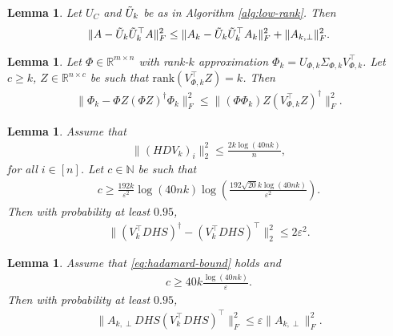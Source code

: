 \documentclass[13pt]{article}
\newtheorem{lem}[thm]{Lemma}
\theoremstyle{plain}
\newcommand{\R}{\mathbb{R}}
\newcommand{\N}{\mathbb{N}}
\newcommand{\rank}{\mathrm{rank}}
\newcommand{\til}{\ensuremath{\tilde}}
\begin{document}
\begin{lem}
    Let $U_C$ and $\til{U}_k$ be as in Algorithm \ref{alg:low-rank}.
    Then
    \[
        \begin{aligned}
            \|A - \til{U}_k\til{U}_k^\top A\|_F^2 \le \|A_k - \til{U}_k\til{U}_k^\top A_k\|_F^2 + \|A_{k, \perp}\|_F^2.
        \end{aligned}
    \]
\end{lem}

\begin{lem}
    Let $\Phi \in \R^{m \times n}$ with rank-$k$ approximation $\Phi_{k} = U_{\Phi, k} \Sigma_{\Phi, k} V^{\top}_{\Phi, k}$.
    Let $c \ge k$, $Z \in \R^{n \times c}$ be such that $\rank(V^\top_{\Phi, k}  Z) = k$.
    Then
    \[
        \begin{aligned}
            \|\Phi_{k} - \Phi Z (\Phi Z)^\dagger\Phi_k\|_F^2 \le \|(\Phi\Phi_k)Z(V^\top_{\Phi, k}Z)^\dagger\|_F^2.
        \end{aligned}
    \] 
\end{lem} 

\begin{lem}
    Assume that
    \begin{align*} \label{eq:hadamard-bound}
        \|(HDV_k)_i\|_2^2 \le \frac{2k\log(40nk)}{n}, \tag{$\ast$}
    \end{align*}
    for all $i \in [n]$.
    Let $c \in \N$ be such that
    \[
        \begin{aligned}
            c \ge \frac{192k}{\varepsilon^2} \log(40nk)\log\left( \frac{192\sqrt{20} k \log(40nk)}{\varepsilon^2} \right).
        \end{aligned}
    \]
    Then with probability at least $0.95$,
    \[
        \begin{aligned}
            \|(V_k^\top DHS)^\dagger - (V_k^\top DHS)^\top\|_2^2 \le 2 \varepsilon^2.
        \end{aligned}
    \] 
\end{lem} 

\begin{lem}
    Assume that \eqref{eq:hadamard-bound} holds and
    \[
        \begin{aligned}
            c \ge 40k \frac{\log(40nk)}{\varepsilon}.
        \end{aligned}
    \]
    Then with probability at least $0.95$,
    \[
        \begin{aligned}
            \|A_{k, \perp}DHS (V_k^\top DHS)^\top\|_F^2 \le \varepsilon \|A_{k, \perp}\|_F^2.
        \end{aligned}
    \] 
\end{lem}
\end{document}
